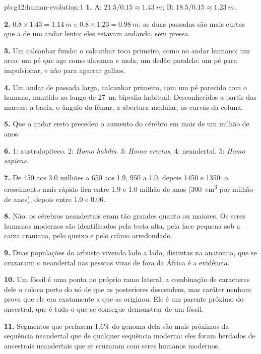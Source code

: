 \begin{solution}{pb:g12:human-evolution:1}
\textbf{1.} A: $21.5/0.15 \approx \qty{1.43}{m}$; B: $18.5/0.15
\approx \qty{1.23}{m}$.

\textbf{2.} $0.8 \times 1.43 = \qty{1.14}{m}$ e $0.8 \times 1.23 =
\qty{0.98}{m}$: as duas passadas são mais curtas que a de um andar
lento; eles estavam andando, sem pressa.

\textbf{3.} Um calcanhar fundo: o calcanhar toca primeiro, como no
andar humano; um arco: um pé que age como alavanca e mola; um dedão
paralelo: um pé para impulsionar, e não para agarrar galhos.

\textbf{4.} Um andar de passada larga, calcanhar primeiro, com um pé
parecido com o humano, mantido ao longo de \qty{27}{m}: bipedia
habitual. Desconhecidos a partir das marcas: a bacia, o ângulo do
fêmur, a abertura medular, as curvas da coluna.

\textbf{5.} Que o andar ereto precedeu o aumento do cérebro em mais de
um milhão de anos.

\textbf{6.} 1: australopiteco. 2: \emph{Homo habilis}. 3: \emph{Homo
erectus}. 4: neandertal. 5: \emph{Homo sapiens}.

\textbf{7.} De 450 aos 3.0 milhões a 650 aos 1.9, 950 a 1.0, depois
1450 e 1350: o crescimento mais rápido fica entre 1.9 e 1.0 milhão de
anos (\qty{300}{cm^3} por milhão de anos), depois entre 1.0 e 0.06.

\textbf{8.} Não: os cérebros neandertais eram tão grandes quanto ou
maiores. Os seres humanos modernos são identificados pela testa alta,
pela face pequena sob a caixa craniana, pelo queixo e pelo crânio arredondado.

\textbf{9.} Duas populações do arbusto vivendo lado a lado, distintas
na anatomia, que se cruzaram: o  neandertal nas pessoas vivas de
fora da África é a evidência.

\textbf{10.} Um fóssil é uma ponta no próprio ramo lateral; a
combinação de caracteres dele o coloca perto do nó de que as 
posteriores descendem, mas caráter nenhum prova que ele era exatamente
a  que as originou. Ele é um parente próximo do ancestral, que
é tudo o que se consegue demonstrar de um fóssil.

\textbf{11.} Segmentos que perfazem 1.6\% do genoma dela são mais
próximos da sequência neandertal que de qualquer sequência moderna:
eles foram herdados de ancestrais neandertais que se cruzaram com seres
humanos modernos.


\end{solution}
